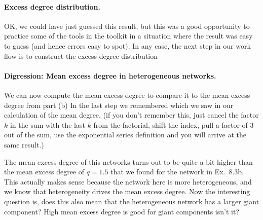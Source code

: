 \paragraph{Excess degree distribution.}OK, we could have just guessed this result, but this was a good opportunity to practice some of the tools in the toolkit in a situation where the result was easy to guess (and hence errors easy to spot). 
In any case, the next step in our work flow is to construct the excess degree distribution
\paragraph{Digression: Mean excess degree in heterogeneous networks.}We can now compute the mean excess degree to compare it to the mean excess degree from part (b)
In the last step we remembered 
which we saw in our calculation of the mean degree. (if you don't remember this, just cancel the factor $k$ in the sum with the last $k$ from the factorial, shift the index, pull a factor of 3 out of the sum, use the exponential series definition and you will arrive at the same result.)  

The mean excess degree of this networks turns out to be quite a bit higher than the mean excess degree of $q=1.5$ that we found for the network in Ex.~8.3b. This actually makes sense because the network here is more heterogeneous, and we know that heterogeneity drives the mean excess degree. Now the interesting question is, does this also mean that the heterogeneous network has a larger giant component? High mean excess degree is good for giant components isn't it? 

